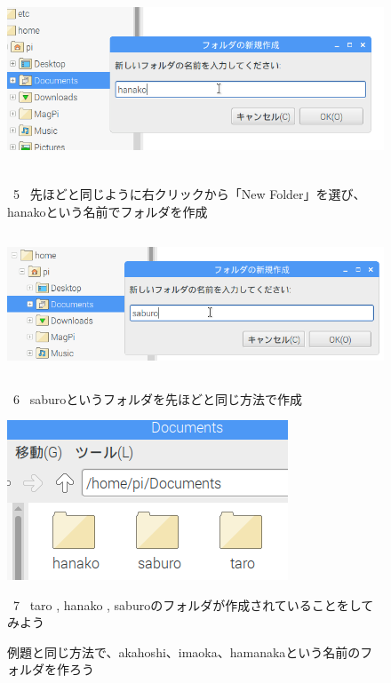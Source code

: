 \documentclass[a4paper,12pt]{jarticle}
\begin{document}
\begin{figure}
  \\
  \vspace{10mm}
  \centering
  \includegraphics[width=14.289cm,height=5.431cm]{textbook-img041.png}
  \begin{minipage}{\textwidth}
    \ 5
    \ 先ほどと同じように右クリックから「New Folder」を選び、hanakoという名前でフォルダを作成
  \end{minipage}

  \centering
  \includegraphics[width=13.884cm,height=4.189cm]{textbook-img042.png}
  \begin{minipage}{\textwidth}
    \ 6
    \ saburoというフォルダを先ほどと同じ方法で作成
  \end{minipage}

  \centering
  \includegraphics[width=8.359cm,height=4.761cm]{textbook-img043.png}
  \begin{minipage}{\textwidth}
    \ 7 \ taro , hanako ,
    saburoのフォルダが作成されていることをしてみよう
  \end{minipage}
  \vspace{10mm}
  \flushleft
  \theQuestion\label{Q:hasAnswer02-1}

  例題と同じ方法で、akahoshi、imaoka、hamanakaという名前のフォルダを作ろう

\end{figure}
\clearpage
{}
\end{document}

